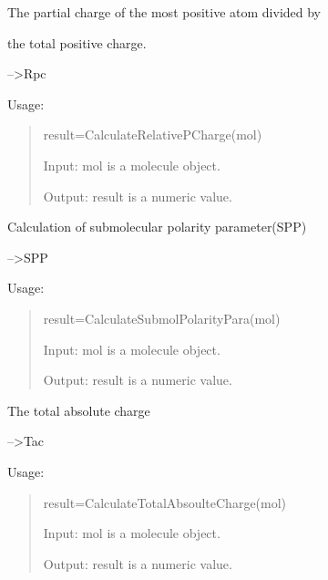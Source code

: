 \documentclass[letterpaper,10pt,english]{sphinxmanual}
\begin{document}

\begin{fulllineitems}
\label{reference/charge:charge.CalculateRelativePCharge}
The partial charge of the most positive atom divided by

the total positive charge.

--\textgreater{}Rpc

Usage:
\begin{quote}

result=CalculateRelativePCharge(mol)

Input: mol is a molecule object.

Output: result is a numeric value.
\end{quote}

\end{fulllineitems}


\begin{fulllineitems}
\label{reference/charge:charge.CalculateSubmolPolarityPara}
Calculation of submolecular polarity parameter(SPP)

--\textgreater{}SPP

Usage:
\begin{quote}

result=CalculateSubmolPolarityPara(mol)

Input: mol is a molecule object.

Output: result is a numeric value.
\end{quote}

\end{fulllineitems}


\begin{fulllineitems}
\label{reference/charge:charge.CalculateTotalAbsoulteCharge}
The total absolute charge

--\textgreater{}Tac

Usage:
\begin{quote}

result=CalculateTotalAbsoulteCharge(mol)

Input: mol is a molecule object.

Output: result is a numeric value.
\end{quote}

\end{fulllineitems}
\end{document}

